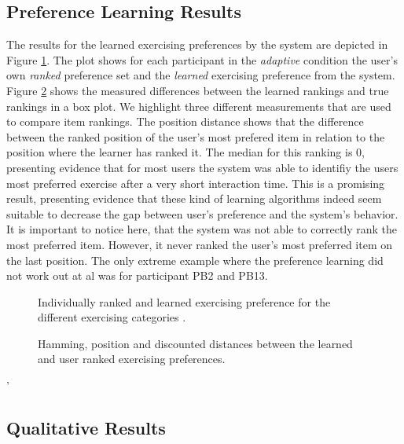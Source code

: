 \documentclass[twocolumn]{svjour3}          %
\begin{document}
\subsection{Preference Learning Results}

The results for the learned exercising preferences by the system are depicted in Figure \ref{fig:userranking}. The plot shows for each participant in the \textit{adaptive} condition the user's own \textit{ranked} preference set and the \textit{learned} exercising preference from the system. Figure \ref{fig:distances} shows the measured differences between the learned rankings and true rankings in a box plot. We highlight three different measurements that are used to compare item rankings.  The position distance shows that the difference between the ranked position of the user's most prefered item in relation to the position where the learner has ranked it. The median for this ranking is 0, presenting evidence that for most users the system was able to identifiy the users most preferred exercise after a very short interaction time. This is a promising result, presenting evidence that these kind of learning algorithms indeed seem suitable to decrease the gap between user's preference and the system's behavior. It is important to notice here, that the system was not able to correctly rank the most preferred item. However, it never ranked the user's most preferred item on the last position. The only extreme example where the preference learning did not work out at al was for participant PB2 and PB13.  

\begin{figure}
 \caption{\label{fig:adapt:mot}Individually ranked and learned exercising preference for the different exercising categories .}\label{fig:userranking}
\end{figure}

\begin{figure}
 \caption{\label{fig:adapt:mot}Hamming, position and discounted distances between the learned and user ranked exercising preferences.}\label{fig:distances}
\end{figure}
'


\subsection{Qualitative Results}
\end{document}
